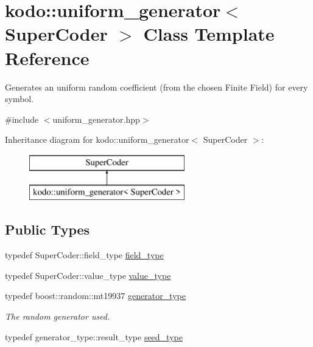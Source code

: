 \hypertarget{classkodo_1_1uniform__generator}{\section{kodo\-:\-:uniform\-\_\-generator$<$ Super\-Coder $>$ Class Template Reference}
\label{classkodo_1_1uniform__generator}
}


Generates an uniform random coefficient (from the chosen Finite Field) for every symbol.  




{\ttfamily \#include $<$uniform\-\_\-generator.\-hpp$>$}

Inheritance diagram for kodo\-:\-:uniform\-\_\-generator$<$ Super\-Coder $>$\-:\begin{figure}[H]
\begin{center}
\leavevmode
\includegraphics[height=2.000000cm]{classkodo_1_1uniform__generator}
\end{center}
\end{figure}
\subsection*{Public Types}
\begin{DoxyCompactItemize}
\item 
typedef Super\-Coder\-::field\-\_\-type \hyperlink{classkodo_1_1uniform__generator_a04203e599b984131091bc822a383a77d}{field\-\_\-type}
\begin{DoxyCompactList}\small\item\em \end{DoxyCompactList}\item 
typedef Super\-Coder\-::value\-\_\-type \hyperlink{classkodo_1_1uniform__generator_ad0b5198a06d1e7a73a62035027e1ec75}{value\-\_\-type}
\begin{DoxyCompactList}\small\item\em \end{DoxyCompactList}\item 
\hypertarget{classkodo_1_1uniform__generator_adb5b38e3d3f319e3097507e4484a1d27}{typedef boost\-::random\-::mt19937 \hyperlink{classkodo_1_1uniform__generator_adb5b38e3d3f319e3097507e4484a1d27}{generator\-\_\-type}}\label{classkodo_1_1uniform__generator_adb5b38e3d3f319e3097507e4484a1d27}

\begin{DoxyCompactList}\small\item\em The random generator used. \end{DoxyCompactList}\item 
typedef generator\-\_\-type\-::result\-\_\-type \hyperlink{classkodo_1_1uniform__generator_a6db7150ba4f8c591c9cfbbb8e3b0e6b3}{seed\-\_\-type}
\begin{DoxyCompactList}\small\item\em \end{DoxyCompactList}\end{DoxyCompactItemize}
